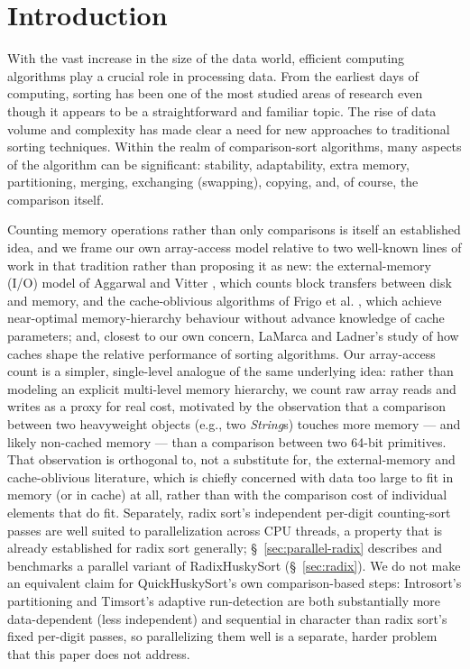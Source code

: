 \documentclass[twoside,leqno,twocolumn]{article}
\begin{document}
\section{Introduction}
With the vast increase in the size of the data world, efficient computing algorithms play a crucial role in processing data.
From the earliest days of computing,
sorting has been one of the most studied areas of research even though it appears to be a straightforward and familiar topic.
The rise of data volume and complexity has made clear a need for new approaches to traditional sorting techniques.
Within the realm of comparison-sort algorithms, many aspects of the algorithm can be significant:
stability, adaptability, extra memory, partitioning, merging, exchanging (swapping), copying, and, of course, the comparison itself.

Counting memory operations rather than only comparisons is itself an established idea,
and we frame our own array-access model relative to two well-known lines of work in that tradition rather than proposing it as new:
the external-memory (I/O) model of Aggarwal and Vitter \cite{10.1145/48529.48535},
which counts block transfers between disk and memory, and the cache-oblivious algorithms of Frigo et al. \cite{814600},
which achieve near-optimal memory-hierarchy behaviour without advance knowledge of cache parameters;
and, closest to our own concern, LaMarca and Ladner's study of how caches shape the relative performance
of sorting algorithms\cite{LAMARCA199966}.
Our array-access count is a simpler, single-level analogue of the same underlying idea:
rather than modeling an explicit multi-level memory hierarchy, we count raw array reads and writes as a proxy for real cost,
motivated by the observation that a comparison between two heavyweight objects (e.g., two \textit{String}s)
touches more memory — and likely non-cached memory — than a comparison between two 64-bit primitives.
That observation is orthogonal to, not a substitute for, the external-memory and cache-oblivious literature,
which is chiefly concerned with data too large to fit in memory (or in cache) at all,
rather than with the comparison cost of individual elements that do fit.
Separately, radix sort's independent per-digit counting-sort passes are well suited to parallelization across CPU threads,
a property that is already established for radix sort generally;
\S~\ref{sec:parallel-radix} describes and benchmarks a parallel variant of RadixHuskySort (\S~\ref{sec:radix}).
We do not make an equivalent claim for QuickHuskySort's own comparison-based steps:
Introsort's partitioning and Timsort's adaptive run-detection are both substantially more data-dependent (less independent) and sequential
in character than radix sort's fixed per-digit passes,
so parallelizing them well is a separate, harder problem that this paper does not address.
\end{document}
